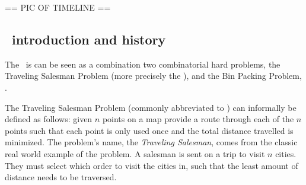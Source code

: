 == PIC OF TIMELINE ==




\subsection{\TSP\ introduction and history}
\label{sec:tiah}

The \VRP\ is can be seen as a combination two combinatorial hard problems, the Traveling Salesman Problem (more precisely the \MTSP), and the Bin Packing Problem, \BPP.

The Traveling Salesman Problem (commonly abbreviated to \TSP) can informally be defined as follows: given $n$ points on a map provide a route through each of the $n$ points such that each point is only used once and the total distance travelled is minimized. The problem's name, the \emph{Traveling Salesman}, comes from the classic real world example of the problem. A salesman is sent on a trip to visit $n$ cities. They must select which order to visit the cities in, such that the least amount of distance needs to be traversed.

